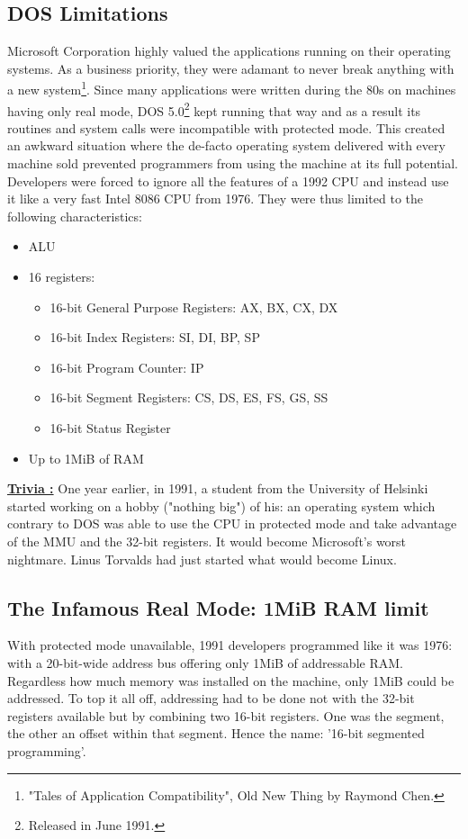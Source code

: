 \documentclass[book.tex]{subfiles}
\begin{document}
  \subsection{DOS Limitations}
  Microsoft Corporation highly valued the applications running on their operating systems. As a business priority, they were adamant to never break anything with a new system\footnote{"Tales of Application Compatibility", Old New Thing by Raymond Chen.}.  Since many applications were written during the 80s on machines having only real mode, DOS 5.0\footnote{Released in June 1991.} kept running that way and as a result its routines and system calls were incompatible with protected mode. This created an awkward situation where the de-facto operating system delivered with every machine sold prevented programmers from using the machine at its full potential. Developers were forced to ignore all the features of a 1992 CPU and instead use it like a very fast Intel 8086 CPU from 1976. They were thus limited to the following characteristics:
\begin{itemize}
\item ALU
\item 16 registers:
\begin{itemize}
  \item 16-bit General Purpose Registers: AX, BX, CX, DX
  \item 16-bit Index Registers: SI, DI, BP, SP
  \item 16-bit Program Counter: IP
  \item 16-bit Segment Registers: CS, DS, ES, FS, GS, SS
  \item 16-bit Status Register
\end{itemize}
\item Up to 1MiB of RAM
\end{itemize}


\bigskip

 \textbf{\underline{Trivia :}} One year earlier, in 1991, a student from the University of Helsinki started working on a hobby ("nothing big") of his: an operating system which contrary to DOS was able to use the CPU in protected mode and take advantage of the MMU and the 32-bit registers. It would become Microsoft's worst nightmare. Linus Torvalds had just started what would become Linux.



  \subsection{The Infamous Real Mode: 1MiB RAM limit}
  With protected mode unavailable, 1991 developers programmed like it was 1976: with a 20-bit-wide address bus offering only 1MiB of addressable RAM. Regardless how much memory was installed on the machine, only 1MiB could be addressed. To top it all off, addressing had to be done not with the 32-bit registers available but by combining two 16-bit registers. One was the segment, the other an offset within that segment. Hence the name: '16-bit segmented programming'.
\end{document}

